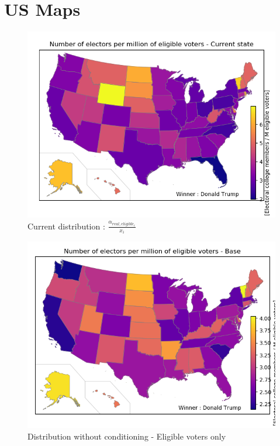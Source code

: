 \documentclass[a4paper,10pt,calibri,oneside,openany, twocolumn]{report}
\theoremstyle{break}
\begin{document}
\clearpage
\section*{US Maps}

\begin{figure}[H]
	\centering
	\includegraphics[width=\linewidth]{mapCurrentEligible}
	\caption{Current distribution : $\frac{\alpha_{real,eligible_i}}{x_i}$}
\end{figure}
\begin{figure}[H]
	\centering
	\includegraphics[width=\linewidth]{mapEligibleBase}
	\caption{Distribution without conditioning - Eligible voters only}
\end{figure}
\end{document}
